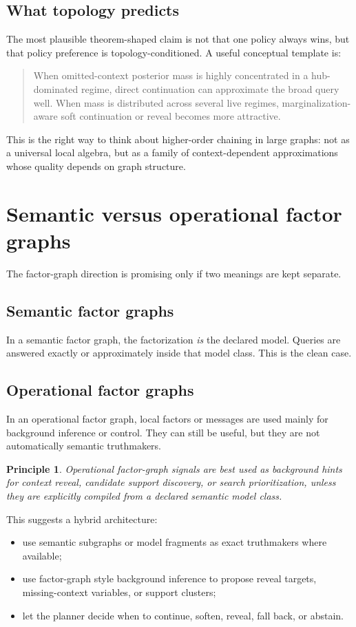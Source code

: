 \documentclass[11pt]{article}
\newtheorem{principle}{Principle}
\begin{document}
\subsection{What topology predicts}
The most plausible theorem-shaped claim is not that one policy always wins, but that policy preference is topology-conditioned. A useful conceptual template is:
\begin{quote}
When omitted-context posterior mass is highly concentrated in a hub-dominated regime, direct continuation can approximate the broad query well. When mass is distributed across several live regimes, marginalization-aware soft continuation or reveal becomes more attractive.
\end{quote}

This is the right way to think about higher-order chaining in large graphs: not as a universal local algebra, but as a family of context-dependent approximations whose quality depends on graph structure.

\section{Semantic versus operational factor graphs}
The factor-graph direction is promising only if two meanings are kept separate.

\subsection{Semantic factor graphs}
In a semantic factor graph, the factorization \emph{is} the declared model. Queries are answered exactly or approximately inside that model class. This is the clean case.

\subsection{Operational factor graphs}
In an operational factor graph, local factors or messages are used mainly for background inference or control. They can still be useful, but they are not automatically semantic truthmakers.

\begin{principle}
Operational factor-graph signals are best used as background hints for context reveal, candidate support discovery, or search prioritization, unless they are explicitly compiled from a declared semantic model class.
\end{principle}

This suggests a hybrid architecture:
\begin{itemize}
    \item use semantic subgraphs or model fragments as exact truthmakers where available;
    \item use factor-graph style background inference to propose reveal targets, missing-context variables, or support clusters;
    \item let the planner decide when to continue, soften, reveal, fall back, or abstain.
\end{itemize}
\end{document}
